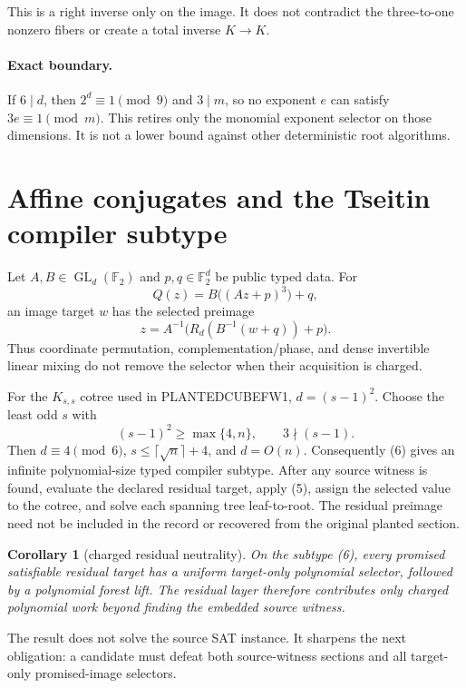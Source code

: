 \documentclass[11pt]{article}
\newtheorem{corollary}[theorem]{Corollary}
\newcommand{\F}{\mathbb F_2}
\begin{document}
This is a right inverse only on the image.  It does not contradict the
three-to-one nonzero fibers or create a total inverse $K\to K$.

\paragraph{Exact boundary.}
If $6\mid d$, then $2^d\equiv1\pmod9$ and $3\mid m$, so no exponent $e$ can
satisfy $3e\equiv1\pmod m$.  This retires only the monomial exponent selector
on those dimensions.  It is not a lower bound against other deterministic
root algorithms.

\section{Affine conjugates and the Tseitin compiler subtype}
Let $A,B\in\operatorname{GL}_d(\F)$ and $p,q\in\F^d$ be public typed data.
For
\[
 Q(z)=B\bigl((Az+p)^3\bigr)+q,                          \tag{4}
\]
an image target $w$ has the selected preimage
\[
 z=A^{-1}\bigl(R_d(B^{-1}(w+q))+p\bigr).               \tag{5}
\]
Thus coordinate permutation, complementation/phase, and dense invertible
linear mixing do not remove the selector when their acquisition is charged.

For the $K_{s,s}$ cotree used in PLANTEDCUBEFW1, $d=(s-1)^2$.  Choose the
least odd $s$ with
\[
 (s-1)^2\ge\max\{4,n\},\qquad 3\nmid(s-1).             \tag{6}
\]
Then $d\equiv4\pmod6$, $s\le\lceil\sqrt n\rceil+4$, and $d=O(n)$.
Consequently (6) gives an infinite polynomial-size typed compiler subtype.
After any source witness is found, evaluate the declared residual target,
apply (5), assign the selected value to the cotree, and solve each spanning
tree leaf-to-root.  The residual preimage need not be included in the record
or recovered from the original planted section.

\begin{corollary}[charged residual neutrality]
On the subtype (6), every promised satisfiable residual target has a uniform
target-only polynomial selector, followed by a polynomial forest lift.  The
residual layer therefore contributes only charged polynomial work beyond
finding the embedded source witness.
\end{corollary}

The result does not solve the source SAT instance.  It sharpens the next
obligation: a candidate must defeat both source-witness sections and all
target-only promised-image selectors.
\end{document}
